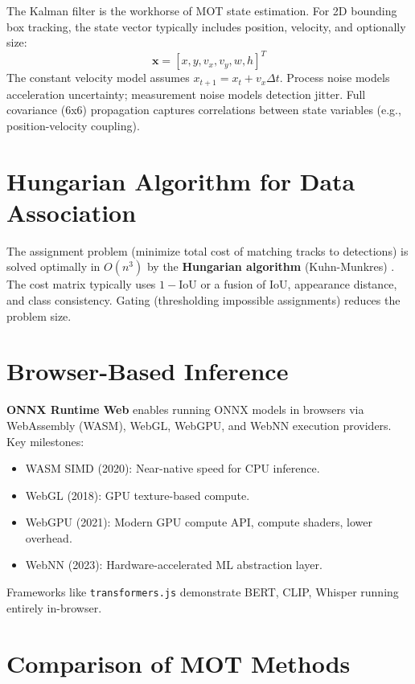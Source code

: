 The Kalman filter \cite{kalman1960new} is the workhorse of MOT state estimation. For 2D bounding box tracking, the state vector typically includes position, velocity, and optionally size:
\[
\mathbf{x} = [x, y, v_x, v_y, w, h]^T
\]
The constant velocity model assumes $x_{t+1} = x_t + v_x \Delta t$. Process noise models acceleration uncertainty; measurement noise models detection jitter. Full covariance (6x6) propagation captures correlations between state variables (e.g., position-velocity coupling).

\section{Hungarian Algorithm for Data Association}
\label{sec:hungarian}

The assignment problem (minimize total cost of matching tracks to detections) is solved optimally in $O(n^3)$ by the \textbf{Hungarian algorithm} (Kuhn-Munkres) \cite{kuhn1955hungarian,munkres1957algorithms}. The cost matrix typically uses $1 - \text{IoU}$ or a fusion of IoU, appearance distance, and class consistency. Gating (thresholding impossible assignments) reduces the problem size.

\section{Browser-Based Inference}
\label{sec:browser-inference}

\textbf{ONNX Runtime Web} \cite{ortweb} enables running ONNX models in browsers via WebAssembly (WASM), WebGL, WebGPU, and WebNN execution providers. Key milestones:
\begin{itemize}
    \item WASM SIMD (2020): Near-native speed for CPU inference.
    \item WebGL (2018): GPU texture-based compute.
    \item WebGPU (2021): Modern GPU compute API, compute shaders, lower overhead.
    \item WebNN (2023): Hardware-accelerated ML abstraction layer.
\end{itemize}
Frameworks like \texttt{transformers.js} \cite{xenova} demonstrate BERT, CLIP, Whisper running entirely in-browser.

\section{Comparison of MOT Methods}
\label{sec:comparison}

